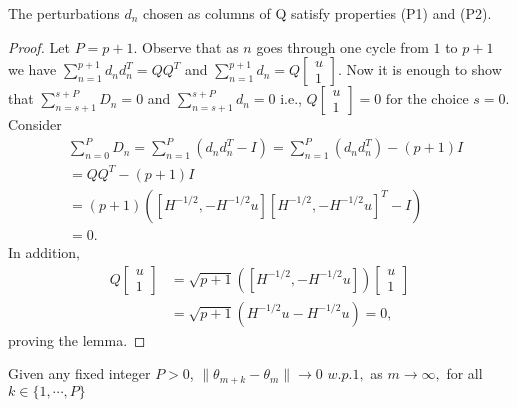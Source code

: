 \begin{lemma}
 The perturbations $d_n$ chosen as columns of Q satisfy properties (P1) and (P2).
\end{lemma}
\begin{proof}
 Let $P=p+1$. Observe that as $n$ goes through one cycle from $1$ to $p+1$ we have
 $\sum\limits_{n=1}^{p+1}d_nd_n^T=QQ^T$ and 
 $\sum\limits_{n=1}^{p+1}d_n= Q\left[\begin{array}{cccc}
 u\\ 1 \end{array}\right]$.
 Now it is enough to show that
 $\sum\limits_{n=s+1}^{s+P}D_n=0$ and 
 $\sum\limits_{n=s+1}^{s+P}d_n= 0$ i.e., 
 $Q\left[\begin{array}{cccc}
 u\\ 1 \end{array}\right]=0 \text{ for the choice } s=0.$
 Consider
 \begin{align*}
 & \sum_{n=0}^{P}D_n=\sum_{n=1}^{P}(d_nd_n^T-I)=\sum_{n=1}^{P}(d_nd_n^T)-(p+1)I\\
 & =QQ^T-(p+1)I\\
 & =(p+1)([H^{-1/2},-H^{-1/2}u][H^{-1/2},-H^{-1/2}u]^T-I)\\
 & = 0.
 \end{align*}
 In addition,
 \begin{align*}
 Q\left[\begin{array}{cccc}
 u\\ 1 \end{array}\right]
 & = \sqrt{p+1}([H^{-1/2},-H^{-1/2}u]) \left[\begin{array}{cccc}
 u\\ 1 \end{array}\right]\\
 & = \sqrt{p+1}(H^{-1/2}u-H^{-1/2}u)= 0,
 \end{align*}
proving the lemma.
\end{proof}
\begin{lemma}
 Given any fixed integer $P>0$, $\|\theta_{m+k}-\theta_{m}\| \rightarrow 0$ $w.p.1,$ as
 $m \rightarrow \infty,$ for all $k \in \{1,\cdots, P\}$
\end{lemma}
